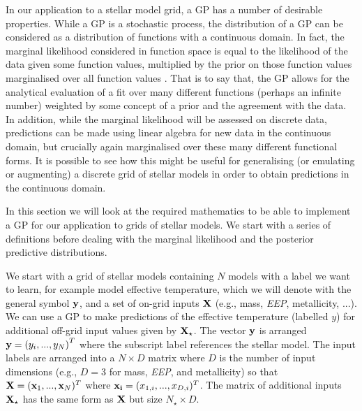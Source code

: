 In our application to a stellar model grid, a GP has a number of desirable properties. While a GP is a stochastic process, the distribution of a GP can be considered as a distribution of functions with a continuous domain.  In fact,  the marginal likelihood considered in function space is equal to the likelihood of the data given some function values,  multiplied by the prior on those function values marginalised over all function values \cite{williams1996gaussian}.  That is to say that, the GP allows for the analytical evaluation of a fit over many different functions (perhaps an infinite number) weighted by some concept of a prior and the agreement with the data. In addition, while the marginal likelihood will be assessed on discrete data,  predictions can be made using linear algebra for new data in the continuous domain, but crucially again marginalised over these many different functional forms.  It is possible to see how this might be useful for generalising (or emulating or augmenting) a discrete grid of stellar models in order to obtain predictions in the continuous domain.

In this section we will look at the required mathematics to be able to implement a GP for our application to grids of stellar models.  We start with a series of definitions before dealing with the marginal likelihood and the posterior predictive distributions. 

We start with a grid of stellar models containing $N$ models with a label we want to learn, for example model effective temperature, which we will denote with the general symbol $\bf y$, and a set of on-grid inputs $\bf X$ (e.g., mass,  {\it EEP},  metallicity,  ...).  We can use a GP to make predictions of the effective temperature (labelled $y$) for additional off-grid input values given by $\bf X_{\star}$.  The vector $\bf y$ is arranged ${\bf y} = \left(y_{i}, ... ,y_{N} \right)^{T}$ where the subscript label references the stellar model.  The input labels are arranged into a $N \times D$ matrix where $D$ is the number of input dimensions (e.g., $D=3$ for mass, {\it EEP}, and metallicity) so that ${\bf X} = ({\bf x}_{1}, ..., {\bf x}_{N})^{T}$ where ${\bf x_{i}} = (x_{1, i}, ..., x_{D, i})^{T}$.  The matrix of additional inputs $\bf X_{\star}$ has the same form as $\bf X$ but size $N_{\star} \times D$.

